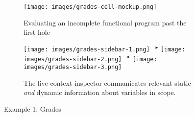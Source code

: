 
\begin{figure}[t]
\begin{subfigure}[t]{\textwidth}
\centering
\texttt{[image: images/grades-cell-mockup.png]}
\vspace{-10px}
\caption{Evaluating an incomplete functional program past the first hole}
\label{fig:grades-cell-mockup}
\end{subfigure}

\vspace{10px}

\begin{subfigure}[t]{\textwidth}
\centering
\texttt{[image: images/grades-sidebar-1.png]}
~${}^\blacktriangleright$
\texttt{[image: images/grades-sidebar-2.png]}
~${}^\blacktriangleright$
\texttt{[image: images/grades-sidebar-3.png]}
\caption{The live context inspector communicates relevant static \emph{and} dynamic information about variables in scope.}
\label{fig:grades-sidebar}
\end{subfigure}


\vspace{3px}

\caption{Example 1: Grades}
\label{fig:grades-example}
\vspace{-5px}
\end{figure}

